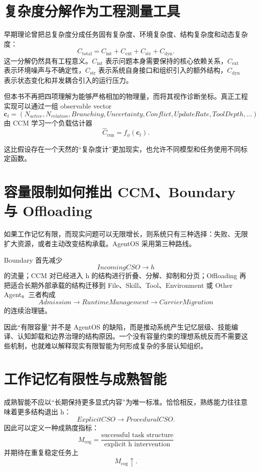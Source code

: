 \section{复杂度分解作为工程测量工具}

早期理论曾把总复杂度分成任务固有复杂度、环境复杂度、结构复杂度和动态复杂度：
\[
C_{\mathrm{total}}
=
C_{\mathrm{int}}
+
C_{\mathrm{ext}}
+
C_{\mathrm{str}}
+
C_{\mathrm{dyn}}.
\]
这一分解仍然具有工程意义。$C_{\mathrm{int}}$ 表示问题本身需要保持的核心依赖关系，$C_{\mathrm{ext}}$ 表示环境噪声与不确定性，$C_{\mathrm{str}}$ 表示系统自身接口和组织引入的额外结构，$C_{\mathrm{dyn}}$ 表示状态变化和并发耦合引入的运行压力。

但本书不再把四项理解为能够严格相加的物理量，而将其视作诊断坐标。真正工程实现可以通过一组 observable vector
\[
\mathbf c_t
=
(
N_{active},
N_{relation},
Branching,
Uncertainty,
Conflict,
UpdateRate,
ToolDepth,\ldots
)
\]
由 CCM 学习一个负载估计器
\[
\hat C_{\mathrm{run}}
=
f_\phi(\mathbf c_t).
\]

这比假设存在一个天然的“复杂度计”更加现实，也允许不同模型和任务使用不同标定函数。

\section{容量限制如何推出 CCM、Boundary 与 Offloading}

如果工作记忆有限，而现实问题可以无限增长，则系统只有三种选择：失败、无限扩大资源，或者主动改变结构承载。AgentOS 采用第三种路线。

Boundary 首先减少
\[
IncomingCSO
\rightarrow h
\]
的流量；CCM 对已经进入 h 的结构进行折叠、分解、抑制和分页；Offloading 再把适合长期外部承载的结构迁移到 File、Skill、Tool、Environment 或 Other Agent。三者构成
\[
Admission
\rightarrow
RuntimeManagement
\rightarrow
CarrierMigration
\]
的连续治理链。

因此“有限容量”并不是 AgentOS 的缺陷，而是推动系统产生记忆层级、技能编译、认知卸载和边界治理的结构原因。一个没有容量约束的理想系统反而不需要这些机制，也就难以解释现实有限智能为何形成复杂的多层认知组织。

\section{工作记忆有限性与成熟智能}

成熟智能不应以“长期保持更多显式内容”为唯一标准。恰恰相反，熟练能力往往意味着更多结构退出 h：
\[
ExplicitCSO
\rightarrow
ProceduralCSO.
\]
因此可以定义一种成熟度指标：
\[
M_{\mathrm{cog}}
=
\frac{\text{successful task structure}}
{\text{explicit h intervention}}
\]
并期待在重复稳定任务上
\[
M_{\mathrm{cog}}\uparrow.
\]

